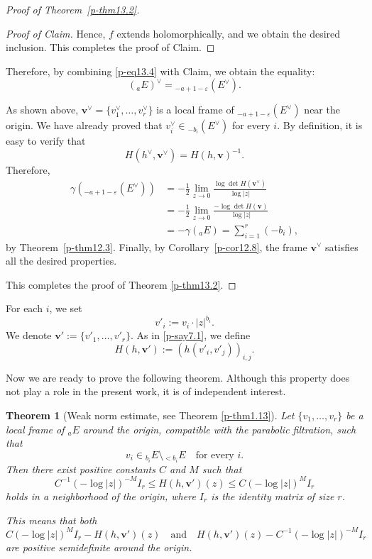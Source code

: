 \documentclass[12pt,twoside]{amsart}
\newtheorem{thm}{Theorem}[section]
\theoremstyle{definition}
\begin{document}
\begin{proof}[Proof of Theorem~\ref{p-thm13.2}]
\begin{proof}[Proof of Claim]
Hence, $f$ extends holomorphically, and we obtain the desired inclusion.
This completes the proof of Claim.
\end{proof}

Therefore,
by combining \eqref{p-eq13.4} with Claim, we obtain the equality:
\[
\left({}_a E\right)^\vee = {}_{-a + 1 - \varepsilon}(E^\vee).
\]

As shown above, 
$\bm{v}^\vee = \{v_1^\vee, \ldots, v_r^\vee\}$ is a local frame of 
${}_{-a + 1 - \varepsilon}(E^\vee)$ near the origin. 
We have already proved that $v_i^\vee \in {}_{-b_i}(E^\vee)$ for every $i$. 
By definition, it is easy to verify that
\[
H(h^\vee, \bm{v}^\vee) = H(h, \bm{v})^{-1}.
\]
Therefore,
\[
\begin{split}
\gamma \left( {}_{-a + 1 - \varepsilon}(E^\vee) \right) 
&= -\frac{1}{2} \lim_{z \to 0} \frac{\log \det H(\bm{v}^\vee)}{\log |z|} \\
&= -\frac{1}{2} \lim_{z \to 0} \frac{-\log \det H(\bm{v})}{\log |z|} \\
&= -\gamma({}_a E) = \sum_{i=1}^r (-b_i),
\end{split}
\]
by Theorem~\ref{p-thm12.3}. 
Finally, by Corollary~\ref{p-cor12.8}, 
the frame $\bm{v}^\vee$ satisfies all the desired properties. 

This completes the proof of Theorem \ref{p-thm13.2}. 
\end{proof}

For each $i$, we set
\[
v'_i := v_i \cdot |z|^{b_i}.
\]
We denote $\bm{v}' := \{v'_1, \ldots, v'_r\}$. 
As in \ref{p-say7.1}, we define
\[
H(h, \bm{v}') := \left(h(v'_i, v'_j)\right)_{i, j}.
\]

Now we are ready to prove the following theorem. 
Although this property does not play a role in the present work, 
it is of independent interest.

\begin{thm}[Weak norm estimate, see Theorem \ref{p-thm1.13}]\label{p-thm13.3}
Let $\{v_1, \ldots, v_r\}$ be a local frame of ${}_a E$ around 
the origin, compatible with the parabolic filtration, such that 
\[
v_i \in {}_{b_i} E \setminus {}_{<b_i} E \quad \text{for every } i.
\]
Then there exist positive constants $C$ and $M$ such that
\[
C^{-1}(-\log |z|)^{-M} I_r \leq H(h, \bm{v}')(z) \leq C(-\log |z|)^M I_r
\]
holds in a neighborhood of the origin, where $I_r$ is 
the identity matrix of size $r$.

This means that both
\[
C(-\log |z|)^M I_r - H(h, \bm{v}')(z)
\quad \text{and} \quad
H(h, \bm{v}')(z) - C^{-1}(-\log |z|)^{-M} I_r
\]
are positive semidefinite around the origin.
\end{thm}
\end{document}
